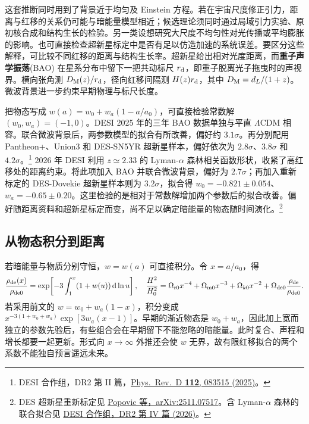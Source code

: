这套推断同时用到了背景近于均匀及 Einstein 方程。若在宇宙尺度修正引力，距离与红移的关系仍可能与暗能量模型相近；候选理论须同时通过局域引力实验、原初核合成和结构生长的检验。另一类设想研究大尺度不均匀性对光传播或平均膨胀的影响。也可直接检查超新星标定中是否有足以仿造加速的系统误差。要区分这些解释，可比较不同红移的距离与结构生长率。超新星给出相对光度距离，而\textbf{重子声学振荡}(BAO) 在星系分布中留下一把共动标尺 $r_{\rm d}$，即重子脱离光子拖曳时的声视界。横向张角测 $D_{\rm M}(z)/r_{\rm d}$，径向红移间隔测 $H(z)r_{\rm d}$，其中 $D_{\rm M}=d_L/(1+z)$。微波背景进一步约束早期物理与标尺长度。

把物态写成 $w(a)=w_0+w_a(1-a/a_0)$，可直接检验常数解 $(w_0,w_a)=(-1,0)$。DESI 2025 年的三年 BAO 数据单独与平直 $\Lambda$CDM 相容。联合微波背景后，两参数模型的拟合有所改善，偏好约 $3.1\sigma$。再分别配用 Pantheon+、Union3 和 DES-SN5YR 超新星样本，偏好依次为 $2.8\sigma$、$3.8\sigma$ 和 $4.2\sigma$。\footnote{DESI 合作组，DR2 第 II 篇，\href{https://arxiv.org/abs/2503.14738}{Phys.\ Rev.\ D \textbf{112}, 083515 (2025)}。}
2026 年 DESI 利用 $z\simeq2.33$ 的 Lyman-$\alpha$ 森林相关函数形状，收紧了高红移处的距离约束。将此项加入 BAO 并联合微波背景，偏好为 $2.7\sigma$；再加入重新标定的 DES-Dovekie 超新星样本则为 $3.2\sigma$，拟合得 $w_0=-0.821\pm0.054$、$w_a=-0.65\pm0.20$。这里检验的是相对于常数解增加两个参数后的拟合改善。偏好随距离资料和超新星标定而变，尚不足以确定暗能量的物态随时间演化。\footnote{DES 超新星重新标定见 \href{https://arxiv.org/abs/2511.07517}{Popovic 等，arXiv:2511.07517}。含 Lyman-$\alpha$ 森林的联合拟合见 \href{https://arxiv.org/abs/2607.27410}{DESI 合作组，DR2 第 IV 篇 (2026)}。}

\subsection{从物态积分到距离}

若暗能量与物质分别守恒，$w=w(a)$ 可直接积分。令 $x=a/a_0$，得
\begin{equation}\label{eq:cosmo-w-background}
 \frac{\rho_{\rm de}(x)}{\rho_{\rm de0}}
 =\exp\!\left[-3\int_1^x(1+w(u))\,\dd\ln u\right],
 \quad
 \frac{H^2}{H_0^2}
 =\Omega_{\rm r0}x^{-4}+\Omega_{\rm m0}x^{-3}
     +\Omega_{k0}x^{-2}+\Omega_{\rm de0}\frac{\rho_{\rm de}}{\rho_{\rm de0}} .
\end{equation}
若采用前文的 $w=w_0+w_a(1-x)$，积分变成 $x^{-3(1+w_0+w_a)}\exp[3w_a(x-1)]$。早期的渐近物态是 $w_0+w_a$，因此加上宽而独立的参数先验后，有些组合会在早期留下不能忽略的暗能量。此时复合、声程和增长都要一起更新。形式向 $x\to\infty$ 外推还会使 $w$ 无界，故有限红移拟合的两个系数不能独自预言遥远未来。


